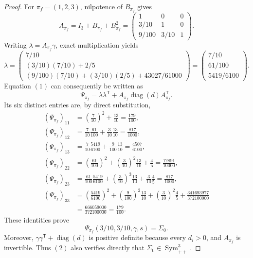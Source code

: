 \documentclass{article}
\begin{document}
\begin{proof}
For \(\pi_f=(1,2,3)\), nilpotence of \(B_{\pi_f}\) gives
\[
 A_{\pi_f}=I_3+B_{\pi_f}+B_{\pi_f}^2
 =\begin{pmatrix}
 1&0&0\\[2pt]
 3/10&1&0\\[2pt]
 9/100&3/10&1
 \end{pmatrix}.
\]
Writing \(\lambda=A_{\pi_f}\gamma\), exact multiplication yields
\[
 \lambda
 =\begin{pmatrix}
 7/10\\[2pt]
 (3/10)(7/10)+2/5\\[2pt]
 (9/100)(7/10)+(3/10)(2/5)+43027/61000
 \end{pmatrix}
 =\begin{pmatrix}7/10\\[2pt]61/100\\[2pt]5419/6100\end{pmatrix}.
\]
Equation \((1)\) can consequently be written as
\[
 \Psi_{\pi_f}=\lambda\lambda^{\mathsf T}
 +A_{\pi_f}\operatorname{diag}(d)A_{\pi_f}^{\mathsf T}.
\]
Its six distinct entries are, by direct substitution,
\[
 \begin{aligned}
 (\Psi_{\pi_f})_{11}
 &=\left(\frac7{10}\right)^2+\frac{13}{10}=\frac{179}{100},\\
 (\Psi_{\pi_f})_{12}
 &=\frac7{10}\frac{61}{100}+\frac3{10}\frac{13}{10}=\frac{817}{1000},\\
 (\Psi_{\pi_f})_{13}
 &=\frac7{10}\frac{5419}{6100}+\frac9{100}\frac{13}{10}=\frac{4507}{6100},\\
 (\Psi_{\pi_f})_{22}
 &=\left(\frac{61}{100}\right)^2+\left(\frac3{10}\right)^2\frac{13}{10}+\frac45
 =\frac{12891}{10000},\\
 (\Psi_{\pi_f})_{23}
 &=\frac{61}{100}\frac{5419}{6100}
 +\left(\frac3{10}\right)^3\frac{13}{10}
 +\frac3{10}\frac45
 =\frac{817}{1000},\\
 (\Psi_{\pi_f})_{33}
 &=\left(\frac{5419}{6100}\right)^2
 +\left(\frac9{100}\right)^2\frac{13}{10}
 +\left(\frac3{10}\right)^2\frac45
 +\frac{341693977}{372100000}\\
 &=\frac{666059000}{372100000}=\frac{179}{100}.
 \end{aligned}
\]
These identities prove
\[
 \Psi_{\pi_f}(3/10,3/10,\gamma,s)=\Sigma_0.
 \tag{2}
\]
Moreover, \(\gamma\gamma^{\mathsf T}+\operatorname{diag}(d)\) is positive definite because every \(d_i>0\), and \(A_{\pi_f}\) is invertible.  Thus \((2)\) also verifies directly that \(\Sigma_0\in\operatorname{Sym}_{++}^3\).


\end{proof}
\end{document}
